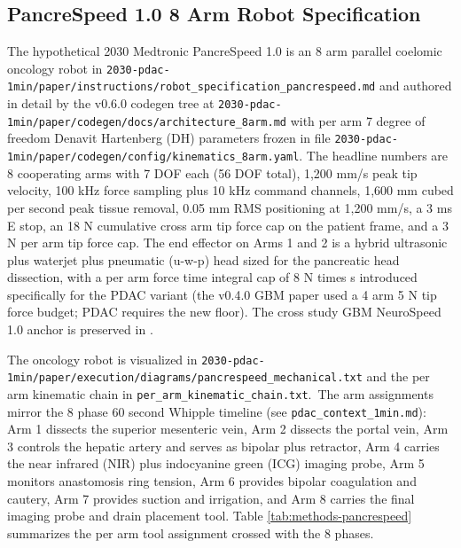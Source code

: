 
\subsection{PancreSpeed 1.0 8 Arm Robot Specification}
\label{sec:methods-robot}

The hypothetical 2030 Medtronic PancreSpeed 1.0 is an 8 arm
parallel coelomic oncology robot in
\texttt{2030-pdac-1min/paper/instructions/robot_specification_pancrespeed.md}
and authored in detail by the v0.6.0 codegen tree at
\texttt{2030-pdac-1min/paper/codegen/docs/architecture_8arm.md}
with per arm 7 degree of freedom Denavit Hartenberg (DH) parameters
frozen in file
\texttt{2030-pdac-1min/paper/codegen/config/kinematics_8arm.yaml}.
The headline numbers are 8 cooperating arms with 7 DOF each (56
DOF total), 1,200 mm/s peak tip velocity, 100 kHz force sampling
plus 10 kHz command channels, 1,600 mm cubed per second peak
tissue removal, 0.05 mm RMS positioning at 1,200 mm/s, a 3 ms E
stop, an 18 N cumulative cross arm tip force cap on the patient
frame, and a 3 N per arm tip force cap. The end effector on Arms 1
and 2 is a hybrid ultrasonic plus waterjet plus pneumatic
(u-w-p) head sized for the pancreatic head dissection, with a per
arm force time integral cap of 8 N times s introduced specifically
for the PDAC variant (the v0.4.0 GBM paper used a 4 arm 5 N tip
force budget; PDAC requires the new floor). The cross study GBM
NeuroSpeed 1.0 anchor is preserved in
\cite{kawchak_2026_20113157}.

The oncology robot is visualized in
\texttt{2030-pdac-1min/paper/execution/diagrams/pancrespeed_mechanical.txt}
and the per arm kinematic chain in
\texttt{per_arm_kinematic_chain.txt}.\ The arm assignments mirror
the 8 phase 60 second Whipple timeline (see
\texttt{pdac_context_1min.md}): Arm 1 dissects the superior
mesenteric vein, Arm 2 dissects the portal vein, Arm 3 controls
the hepatic artery and serves as bipolar plus retractor, Arm 4
carries the near infrared (NIR) plus indocyanine green (ICG)
imaging probe, Arm 5 monitors anastomosis ring tension, Arm 6
provides bipolar coagulation and cautery, Arm 7 provides suction
and irrigation, and Arm 8 carries the final imaging probe and
drain placement tool. Table \ref{tab:methods-pancrespeed}
summarizes the per arm tool assignment crossed with the 8 phases.

